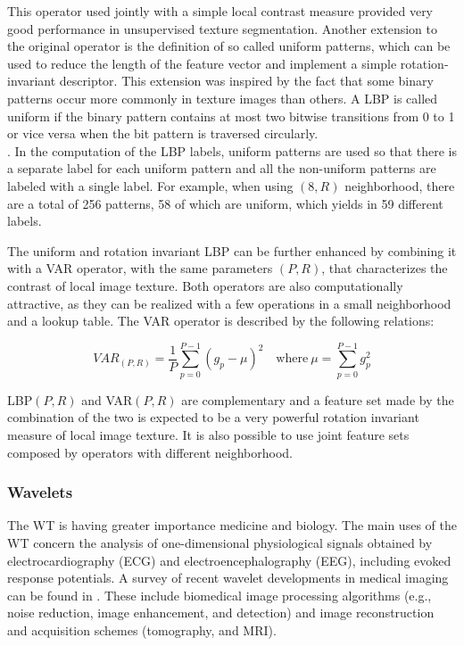 This operator used jointly with a simple local contrast measure provided very good performance in unsupervised texture segmentation.
Another extension to the original operator is the definition of so called uniform patterns, which can be used to reduce the length of the feature
vector and implement a simple rotation-invariant descriptor. This extension was inspired by the fact that some binary patterns occur more commonly
in texture images than others. A \Gls{LBP} is called uniform if the binary pattern contains at most two bitwise transitions from 0 to 1
or vice versa when the bit pattern is traversed circularly.\\
. In the computation of the \Gls{LBP} labels, uniform patterns are used so that there is a separate label for each uniform pattern and all
the non-uniform patterns are labeled with a single label.
For example, when using $(8,R)$ neighborhood, there are a total of 256 patterns, 58 of which are uniform, which yields in 59 different labels. 

The uniform and rotation invariant \Gls{LBP}  can be further enhanced by combining it with a \Gls{VAR} operator, with the same parameters $(P,R)$,
that characterizes the contrast of local image texture\cite{LBP02}.
Both operators are also computationally attractive, as they can be realized with a few operations in a small neighborhood and a lookup table.
The \Gls{VAR} operator is described by the following relations:

\begin{equation}
 VAR_{(P,R)} = \frac{1}{P} \sum_{p=0}^{P-1}(g_p - \mu)^{2} \quad \textrm{where} \ \mu = \sum_{p=0}^{P-1}g_p^2
\end{equation}

\Gls{LBP}$(P,R)$ and \Gls{VAR}$(P,R)$ are complementary and a feature set made by the combination of the two is expected to be a very
powerful rotation invariant measure of local image texture. It is also possible to use joint feature sets composed by operators with different neighborhood.

\subsubsection{Wavelets}

The \Gls{WT} is having greater importance medicine and biology.
The main uses of the \Gls{WT} concern the analysis of one-dimensional physiological signals obtained by electrocardiography (ECG)
and electroencephalography (EEG), including evoked response potentials\cite{wavelets}.
A survey of recent wavelet developments in medical imaging can be found in \cite{waveletsBiomed}.
These include biomedical image processing algorithms (e.g., noise reduction, image enhancement, and detection) and
image reconstruction and acquisition schemes (tomography, and \Gls{MRI}).


